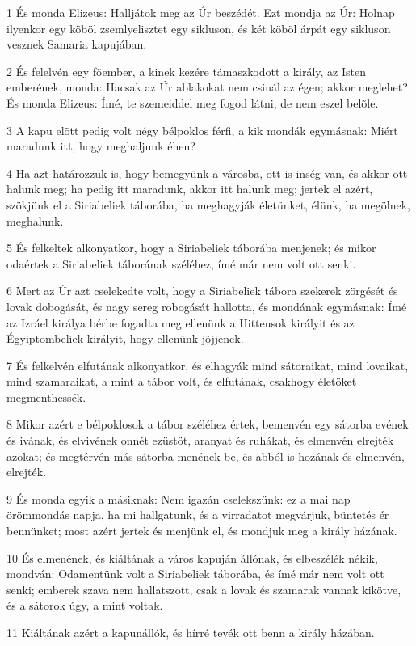 \par 1 És monda Elizeus: Halljátok meg az Úr beszédét. Ezt mondja az Úr: Holnap ilyenkor egy köböl zsemlyelisztet egy sikluson, és két köböl árpát egy sikluson vesznek Samaria kapujában.
\par 2 És felelvén egy fõember, a kinek kezére támaszkodott a király, az Isten emberének, monda: Hacsak az Úr ablakokat nem csinál az égen; akkor meglehet? És monda Elizeus: Ímé, te szemeiddel meg fogod látni, de nem eszel belõle.
\par 3 A kapu elõtt pedig volt négy bélpoklos férfi, a kik mondák egymásnak: Miért maradunk itt, hogy meghaljunk éhen?
\par 4 Ha azt határozzuk is, hogy bemegyünk a városba, ott is inség van, és akkor ott halunk meg; ha pedig itt maradunk, akkor itt halunk meg; jertek el azért, szökjünk el a Siriabeliek táborába, ha meghagyják életünket, élünk, ha megölnek, meghalunk.
\par 5 És felkeltek alkonyatkor, hogy a Siriabeliek táborába menjenek; és mikor odaértek a Siriabeliek táborának széléhez, ímé már nem volt ott senki.
\par 6 Mert az Úr azt cselekedte volt, hogy a Siriabeliek tábora szekerek zörgését és lovak dobogását, és nagy sereg robogását hallotta, és mondának egymásnak: Ímé az Izráel királya bérbe fogadta meg ellenünk a Hitteusok királyit és az Égyiptombeliek királyit, hogy ellenünk jõjjenek.
\par 7 És felkelvén elfutának alkonyatkor, és elhagyák mind sátoraikat, mind lovaikat, mind szamaraikat, a mint a tábor volt, és elfutának, csakhogy életöket megmenthessék.
\par 8 Mikor azért e bélpoklosok a tábor széléhez értek, bemenvén egy sátorba evének és ivának, és elvivének onnét ezüstöt, aranyat és ruhákat, és elmenvén elrejték azokat; és megtérvén más sátorba menének be, és abból is hozának és elmenvén, elrejték.
\par 9 És monda egyik a másiknak: Nem igazán cselekszünk: ez a mai nap örömmondás napja, ha mi hallgatunk, és a virradatot megvárjuk, büntetés ér bennünket; most azért jertek és menjünk el, és mondjuk meg a király házának.
\par 10 És elmenének, és kiáltának a város kapuján állónak, és elbeszélék nékik, mondván: Odamentünk volt a Siriabeliek táborába, és ímé már nem volt ott senki; emberek szava nem hallatszott, csak a lovak és szamarak vannak kikötve, és a sátorok úgy, a mint voltak.
\par 11 Kiáltának azért a kapunállók, és hírré tevék ott benn a király házában.
